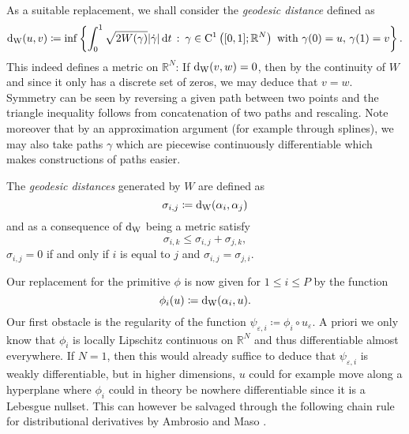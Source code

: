 As a suitable replacement, we shall consider the \emph{geodesic distance} defined as 
\begin{equation*}
		\geodesic_distance ( u, v )
		\coloneqq
		\inf
		\left\{
		\int_{ 0 }^{ 1 }
		\sqrt{ 2 W ( \gamma ) }
		\abs{ \dot{ \gamma }  }
		\dd{t}
		\,
		\colon
		\, \gamma \in \mathrm{ C }^{ 1 } \left( [0, 1 ] ; \mathbb{ R }^{ N } \right) \text{ with } \gamma( 0 ) = u,\, \gamma( 1 )= v 
		\right\}.
\end{equation*}
This indeed defines a metric on $ \mathbb{ R }^{ N } $: If $ \geodesic_distance ( v, w ) = 0 $, then by the continuity of $ W $ and since it only has a discrete set of zeros, we may deduce that $ v = w $. Symmetry can be seen by reversing a given path between two points and the triangle inequality follows from concatenation of two paths and rescaling.
Note moreover that by an approximation argument (for example through splines), we may also take paths $ \gamma $ which are piecewise continuously differentiable which makes constructions of paths easier.

The \emph{geodesic distances} generated by $ W $  are defined as
\begin{equation*}
	\sigma_{ i , j } 
	\coloneqq
	\geodesic_distance ( \alpha_{ i } , \alpha_{ j } )
\end{equation*}
and as a consequence of $ \geodesic_distance $ being a metric satisfy
\begin{equation*}
	\sigma_{ i , k } \leq \sigma_{ i , j } + \sigma_{ j , k },
\end{equation*}
$ \sigma_{ i , j } = 0 $ if and only if $ i $ is equal to $ j $ and $ \sigma_{ i , j } = \sigma_{ j, i } $.

Our replacement for the primitive $ \phi $ is now given for $ 1 \leq i \leq P $ by the function
\begin{equation*}
	\phi_{ i } ( u ) 
	\coloneqq
	\geodesic_distance ( \alpha_{ i } , u ).
\end{equation*}
Our first obstacle is the regularity of the function $ \psi_{ \varepsilon, i } 
\coloneqq \phi_{ i } \circ u_{ \varepsilon } $. A priori we only know that $ 
\phi_{ i } $ is locally Lipschitz continuous on $ \mathbb{ R }^{ N } $ and thus 
differentiable almost everywhere. If $ N = 1 $, then this would already suffice 
to deduce that $ \psi_{ \varepsilon, i  }$ is weakly differentiable, but in 
higher dimensions, $ u $ could for example move along a hyperplane where $ 
\phi_{ i } $ could in theory be nowhere differentiable since it is a Lebesgue 
nullset. This can however be salvaged through the following chain rule for 
distributional derivatives by Ambrosio and Maso 
\cite[Cor.~3.2]{ambrosio_maso_chain_rule}.

